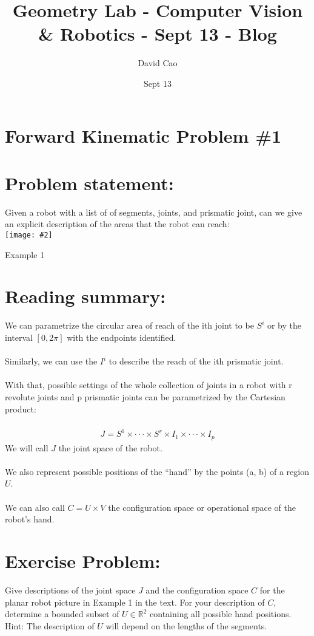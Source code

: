 \documentclass[11pt]{article}
\title{Geometry Lab - Computer Vision \& Robotics - Sept 13 - Blog}
\author{David Cao}
\date{Sept 13}
\newcommand{\image}[2]{\texttt{[image: \#2]}}
\newcommand{\myalign}[1]{\begin{align*}#1\end{align*}}
\begin{document}
\maketitle

\section*{Forward Kinematic Problem \#1}

\section{Problem statement:}
Given a robot with a list of of segments, joints, and prismatic joint, can we give an explicit description of the areas that the robot can reach:
\vspace{3em} \\
\image{0.75}{img1}\\
\begin{center}
  Example 1
\end{center}

\section{Reading summary:}

We can parametrize the circular area of reach of the ith joint to be $S^i$ or by the interval $[0, 2\pi]$ with the endpoints identified.  \\
\\
Similarly, we can use the $I^i$ to describe the reach of the ith prismatic joint.  \\
\\
With that, possible settings of the whole collection of joints in a robot with r revolute joints and p prismatic joints can be parametrized by the Cartesian product:  \\
\\
\myalign{
  J = S^1 \times \cdot\cdot\cdot \times S^r \times I_1 \times \cdot\cdot\cdot \times I_p
}
We will call $J$ the joint space of the robot.\\
\\
We also represent possible positions of the “hand” by the points (a, b) of a region $U$. \\
\\
We can also call $C = U \times V$  the configuration space or operational space of the robot's
hand. \\
\section{Exercise Problem:}
Give descriptions of the joint space $J$ and the configuration space $C$ for the planar robot picture in Example 1 in the text. For your description of $C$, determine a bounded subset of $U \in \mathbb{R}^2$ containing all possible hand positions. Hint: The description of $U$ will depend on the lengths of the segments. \\
\end{document}
